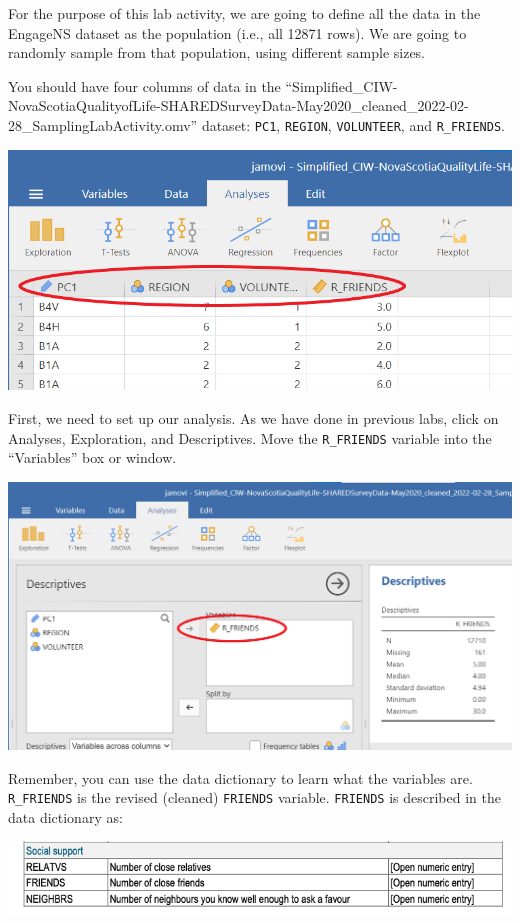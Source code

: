 \documentclass[
]{book}
\begin{document}
For the purpose of this lab activity, we are going to define all the data in the EngageNS dataset as the population (i.e., all 12871 rows). We are going to randomly sample from that population, using different sample sizes.

You should have four columns of data in the ``Simplified\_CIW-NovaScotiaQualityofLife-SHAREDSurveyData-May2020\_cleaned\_2022-02-28\_SamplingLabActivity.omv'' dataset: \texttt{PC1}, \texttt{REGION}, \texttt{VOLUNTEER}, and \texttt{R\_FRIENDS}.

\includegraphics{img/simplified_file.png}

First, we need to set up our analysis. As we have done in previous labs, click on {Analyses}, {Exploration}, and {Descriptives}. Move the \texttt{R\_FRIENDS} variable into the ``Variables'' box or window.

\includegraphics{img/AnalysisWithFriendsVariable.png}

Remember, you can use the data dictionary to learn what the variables are. \texttt{R\_FRIENDS} is the revised (cleaned) \texttt{FRIENDS} variable. \texttt{FRIENDS} is described in the data dictionary as:

\includegraphics{img/FRIENDSdictionary.png}
\end{document}
